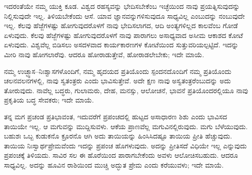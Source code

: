 \vskip 0.2cm

ಇದರಂತೆಯೇ ನಮ್ಮ ಯುಕ್ತಿ ಕೂಡ. ವಿಶ್ವದ ರಹಸ್ಯವನ್ನು ಭೇದಿಸಬೇಕೆಂಬ ಇಚ್ಛೆಯಿಂದ ನಾವು ಪ್ರಯತ್ನಿಸುವುದನ್ನು ನಿಲ್ಲಿಸುವುದೇ ಇಲ್ಲ. ತಿಳಿಯಬೇಕೆಂದು ಆಸೆ. ಯಾವ ಜ್ಞಾನವನ್ನುಗಳಿಸುವುದೂ ಸಾಧ್ಯವಿಲ್ಲ ಎಂಬುದನ್ನು ನಂಬುವುದೇ ಇಲ್ಲ. ಕೆಲವು ಹೆಜ್ಜೆಗಳಷ್ಟು ಹೋಗುವುದರೊಳಗೆ ನಾವು ಭೇದಿಸಲಾಗದ, ಆದಿ ಅಂತ್ಯಗಳಿಲ್ಲದ ಕಾಲವೆಂಬ ಗೋಡೆ ಏಳುವುದು. ಕೆಲವು ಹೆಜ್ಜೆಗಳಷ್ಟು ಹೋಗುವುದರೊಳಗೆ ನಾವು ಪಾರಾಗಲು ಅಸಾಧ್ಯವಾದ ಅಸೀಮ ಆಕಾಶದ ಕೋಟೆ ಏಳುವುದು. ವಿಶ್ವವೆಲ್ಲ ಬಿಡಿಸಲು ಅಸದಳವಾದ ಕಾರ್ಯಕಾರಣಗಳ ಕೋಟೆಯಿಂದ ಸುತ್ತುವರಿಯಲ್ಪಟ್ಟಿದೆ. ಇದನ್ನು ಮೀರಿ ನಾವು ಹೋಗಲಾರೆವು. ಆದರೂ ಹೋರಾಡುತ್ತೇವೆ, ಹೋರಾಡಲೇಬೇಕು; ಇದೇ ಮಾಯೆ.

\vskip 0.2cm

ನಮ್ಮ ಉಚ್ಛ್ವಾಸ–ನಿಃಶ್ವಾಸಗಳೊಂದಿಗೆ, ನಮ್ಮ ಹೃದಯದ ಪ್ರತಿಯೊಂದು ಸ್ಪಂದನದೊಂದಿಗೆ ನಮ್ಮ ಪ್ರತಿಯೊಂದು ಚಲನವಲನಗಳಲ್ಲಿ, ನಾವು ಸ್ವತಂತ್ರರು ಎಂದು ಭಾವಿಸುತ್ತೇವೆ. ಅದೇ ಕ್ಷಣ ನಾವು ಅಸ್ವತಂತ್ರರೆಂಬುದನ್ನು ಅದು ತೋರುವುದು. ನಾವೆಲ್ಲ ಬದ್ಧರು, ಗುಲಾಮರು, ದೇಹ, ಮನಸ್ಸು, ಆಲೋಚನೆ, ಭಾವನೆ ಪ್ರತಿಯೊಂದರಲ್ಲಿಯೂ ನಾವು ಪ್ರಕೃತಿಯ ಬದ್ಧ ಸೇವಕರು; ಇದೇ ಮಾಯೆ.

\vskip 0.2cm

ತನ್ನ ಮಗ ಪ್ರಚಂಡ ಪ್ರತಿಭಾವಂತ, ಇದುವರೆಗೆ ಪ್ರಪಂಚದಲ್ಲಿ ಹುಟ್ಟದ ಅಸಾಧಾರಣ ಶಿಶು ಎಂದು ಭಾವಿಸದ ತಾಯಿಯೇ ಇಲ್ಲ. ಆ ಮಗುವನ್ನು ಮುದ್ದಿಸುವಳು. ಆಕೆಯ ಪ್ರಾಣವೆಲ್ಲ ಮಗುವಿನಲ್ಲಿರುವುದು. ಮಗು ಬೆಳೆಯುವುದು. ಬಹುಶಃ ಒಬ್ಬ ಕುಡುಕನೊ ಕ್ರೂರನೊ ಆಗಿ ಅದು ತಾಯಿಯನ್ನು ಹಿಂಸಿಸಿದಷ್ಟೂ ತಾಯಿಯ ಪ್ರೀತಿ ಹೆಚ್ಚುವುದು. ತಾಯಿಯ ನಿಃಸ್ವಾರ್ಥಪ್ರೇಮವೆಂದು ಇದನ್ನು ಪ್ರಪಂಚ ಹೊಗಳುವುದು. ಅದನ್ನು ಪ್ರೀತಿಸದೆ ವಿಧಿಯೇ ಇಲ್ಲ ಎನ್ನುವುದು ಪ್ರಪಂಚಕ್ಕೆ ತಿಳಿಯದು. ಸಾವಿರ ಸಲ ಈ ಹೊರೆಯಿಂದ ಪಾರಾಗಬೇಕೆಂದು ಅವಳು ಆಲೋಚಿಸಬಹುದು. ಆದರೂ ಸಾಧ್ಯವಿಲ್ಲ. ಅದನ್ನು ಹೂವಿನ ರಾಶಿಯಿಂದ ಮುಚ್ಚಿ ಅದ್ಭುತ ಪ್ರೇಮ ಎಂದು ಕರೆಯುವಳು; ಇದೇ ಮಾಯೆ.

\vskip 0.3cm

